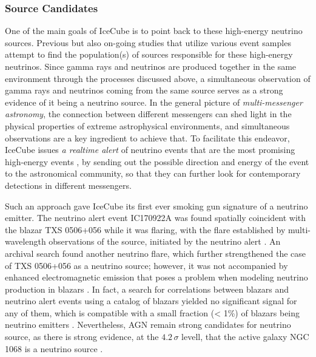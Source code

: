 
\subsubsection*{Source Candidates}
\label{sec:sources_astro_nu}

One of the main goals of IceCube is to point back to these high-energy neutrino sources. Previous but also on-going studies that utilize various event samples attempt to find the population(s) of sources responsible for these high-energy neutrinos. Since gamma rays and neutrinos are produced together in the same environment through the processes discussed above, a simultaneous observation of gamma rays and neutrinos coming from the same source serves as a strong evidence of it being a neutrino source. In the general picture of \emph{multi-messenger astronomy}, the connection between different messengers can shed light in the physical properties of extreme astrophysical environments, and simultaneous observations are a key ingredient to achieve that. To facilitate this endeavor, IceCube issues \emph{a realtime alert} of neutrino events that are the most promising high-energy events , by sending out the possible direction and energy of the event to the astronomical community, so that they can further look for contemporary detections in different messengers.

Such an approach gave IceCube its first ever smoking gun signature of a neutrino emitter. The neutrino alert event IC170922A was found spatially coincident with the blazar TXS 0506+056 while it was flaring, with the flare established by multi-wavelength observations of the source, initiated by the neutrino alert . An archival search found another neutrino flare, which further strengthened the case of TXS 0506+056 as a neutrino source; however, it was not accompanied by enhanced electromagnetic emission  that poses a problem when modeling neutrino production in blazars . In fact, a search for correlations between blazars and neutrino alert events using a catalog of blazars yielded no significant signal for any of them, which is compatible with a small fraction (< 1\%) of blazars being neutrino emitters . Nevertheless, AGN remain strong candidates for neutrino source, as there is strong evidence, at the $4.2\,\sigma$ levell, that the active galaxy NGC 1068 is a neutrino source .

